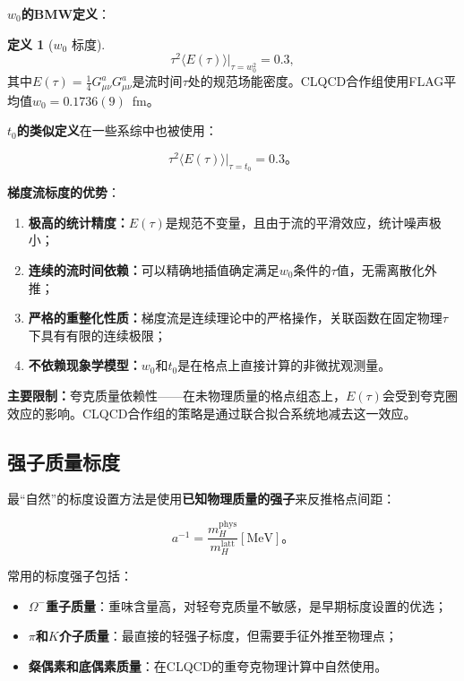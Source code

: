 \documentclass[12pt,a4paper]{ctexart}
\theoremstyle{definition}
\newtheorem{definition}{定义}[section]
\begin{document}
\textbf{$w_0$的BMW定义}\cite{CLQCD2024charm,CLQCD2025quark_mass}：

\begin{definition}[$w_0$ 标度]
\begin{equation}
\boxed{\tau^2 \langle E(\tau) \rangle \big|_{\tau = w^2_0} = 0.3},
\label{eq:w0_definition}
\end{equation}
其中$E(\tau) = \frac{1}{4}G^a_{\mu\nu}G^a_{\mu\nu}$是流时间$\tau$处的规范场能密度。CLQCD合作组使用FLAG平均值$w_0 = 0.1736(9)$~fm\cite{CLQCD2024charm,CLQCD2025quark_mass}。
\end{definition}

\textbf{$t_0$的类似定义}在一些系综中也被使用\cite{Egerer2022,Egerer2021a}：

\begin{equation}
\boxed{\tau^2 \langle E(\tau) \rangle \big|_{\tau = t_0} = 0.3}。
\label{eq:t0_definition}
\end{equation}

\textbf{梯度流标度的优势}：

\begin{enumerate}
    \item \textbf{极高的统计精度：}$E(\tau)$是规范不变量，且由于流的平滑效应，统计噪声极小；
    \item \textbf{连续的流时间依赖：}可以精确地插值确定满足$w_0$条件的$\tau$值，无需离散化外推；
    \item \textbf{严格的重整化性质：}梯度流是连续理论中的严格操作，关联函数在固定物理$\tau$下具有有限的连续极限；
    \item \textbf{不依赖现象学模型：}$w_0$和$t_0$是在格点上直接计算的非微扰观测量。
\end{enumerate}

\textbf{主要限制：}夸克质量依赖性——在未物理质量的格点组态上，$E(\tau)$会受到夸克圈效应的影响。CLQCD合作组的策略是通过联合拟合系统地减去这一效应。

\subsection{强子质量标度}

最``自然''的标度设置方法是使用\textbf{已知物理质量的强子}来反推格点间距：

\begin{equation}
a^{-1} = \frac{m^{\text{phys}}_H}{m^{\text{latt}}_H} [\text{MeV}]。
\label{eq:hadron_mass_scale}
\end{equation}

常用的标度强子包括：
\begin{itemize}
    \item \textbf{$\Omega^-$重子质量}：重味含量高，对轻夸克质量不敏感，是早期标度设置的优选；
    \item \textbf{$\pi$和$K$介子质量}：最直接的轻强子标度，但需要手征外推至物理点；
    \item \textbf{粲偶素和底偶素质量}：在CLQCD的重夸克物理计算中自然使用。
\end{itemize}
\end{document}
